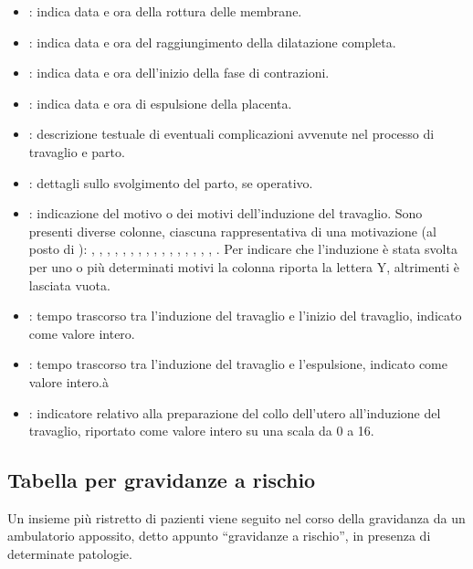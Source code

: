 \begin{itemize}
\item {}: indica data e ora della rottura delle membrane.
\item {}: indica data e ora del raggiungimento della dilatazione completa.
\item {}: indica data e ora dell'inizio della fase di contrazioni.
\item {}: indica data e ora di espulsione della placenta.
\item {}: descrizione testuale di eventuali complicazioni avvenute nel processo di travaglio e parto.
\item {}: dettagli sullo svolgimento del parto, se operativo.
\item {}: indicazione del motivo o dei motivi dell'induzione del travaglio. Sono presenti diverse colonne, ciascuna rappresentativa di una motivazione (al posto di ): , , , , , , , , , , , , , , , , . Per indicare che l'induzione è stata svolta per uno o più determinati motivi la colonna riporta la lettera Y, altrimenti è lasciata vuota.
\item {}: tempo trascorso tra l'induzione del travaglio e l'inizio del travaglio, indicato come valore intero.
\item {}: tempo trascorso tra l'induzione del travaglio e l'espulsione, indicato come valore intero.à
\item {}: indicatore relativo alla preparazione del collo dell'utero all'induzione del travaglio, riportato come valore intero su una scala da 0 a 16.
\end{itemize}

\subsection{Tabella per gravidanze a rischio}
\label{pregnanciesatrisk}

Un insieme più ristretto di pazienti viene seguito nel corso della gravidanza da un ambulatorio appossito, detto appunto \enquote{gravidanze a rischio}, in presenza di determinate patologie.

